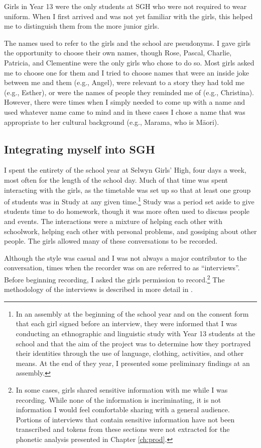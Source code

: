 Girls in Year 13 were the only students at SGH who were not required to wear uniform. When I first arrived and was not yet familiar with the girls, this helped me to distinguish them from the more junior girls.

The names used to refer to the girls and the school are pseudonyms. I gave girls the opportunity to choose their own names, though Rose, Pascal, Charlie, Patricia, and Clementine were the only girls who chose to do so. Most girls asked me to choose one for them and I tried to choose names that were an inside joke between me and them (e.g., Angel), were relevant to a story they had told me (e.g., Esther), or were the names of people they reminded me of (e.g., Christina). However, there were times when I simply needed to come up with a name and used whatever name came to mind and in these cases I chose a name that was appropriate to her cultural background (e.g., Marama, who is M\=aori).




\subsection{Integrating myself into SGH}

I spent the entirety of the school year at Selwyn Girls' High, four days a week, most often for the length of the school day. Much of that time was spent interacting with the girls, as the timetable was set up so that at least one group of students was in Study at any given time.\footnote{In an assembly at the beginning of the school year and on the consent form that each girl signed before an interview, they were informed that I was conducting an ethnographic and linguistic study with Year 13 students at the school and that the aim of the project was to determine how they portrayed their identities through the use of language, clothing, activities, and other means. At the end of they year, I presented some preliminary findings at an assembly.}  Study was a period set aside to give students time to do homework, though it was more often used to discuss people and events. The interactions were a mixture of helping each other with schoolwork, helping each other with personal problems, and gossiping about other people. The girls allowed many of these conversations to be recorded.

Although the style was casual and I was not always a major contributor to the conversation, times when the recorder was on are referred to as ``interviews''. Before beginning recording, I asked the girls permission to record.\footnote{In some cases, girls shared sensitive information with me while I was recording. While none of the information is incriminating, it is not information I would feel comfortable sharing with a general audience. Portions of interviews that contain sensitive information have not been transcribed and tokens from these sections were not extracted for the phonetic analysis presented in Chapter \ref{ch:prod}.}  The methodology of the interviews is described in more detail in .


